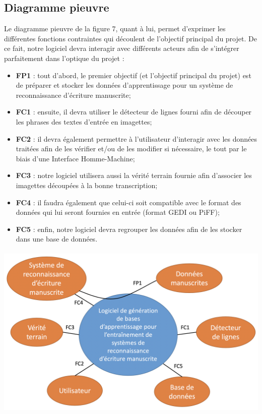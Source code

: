 \subsection{Diagramme pieuvre}

Le diagramme pieuvre de la figure 7, quant à lui, permet d’exprimer les différentes fonctions contraintes
qui découlent de l’objectif principal du projet. De ce fait, notre logiciel devra interagir
avec différents acteurs afin de s’intégrer parfaitement dans l’optique du projet :

\begin{itemize}
\item \textbf{FP1} : tout d’abord, le premier objectif (et l’objectif principal du projet) est
de préparer et stocker les données d’apprentissage pour un système de reconnaissance d’écriture manuscrite;
\item \textbf{FC1} : ensuite, il devra utiliser le détecteur de lignes fourni afin de découper
les phrases des textes d’entrée en imagettes;
\item \textbf{FC2} : il devra également permettre à l’utilisateur d’interagir avec les données
traitées afin de les vérifier et/ou de les modifier si nécessaire, le tout par le biais d’une Interface Homme-Machine;
\item \textbf{FC3} : notre logiciel utilisera aussi la vérité terrain fournie afin d’associer
les imagettes découpées à la bonne transcription;
\item \textbf{FC4} : il faudra également que celui-ci soit compatible avec le format des données
qui lui seront fournies en entrée (format GEDI ou PiFF);
\item \textbf{FC5} : enfin, notre logiciel devra regrouper les données afin de les stocker dans une base de données.
\end{itemize}

\paragraph{}
\begin{mdframed}[frametitle={Figure 7 : Diagramme pieuvre}, innerbottommargin=10]
\begin{center}
\includegraphics[width=0.6\linewidth]{pieuvre.png}
\end{center}
\end{mdframed}